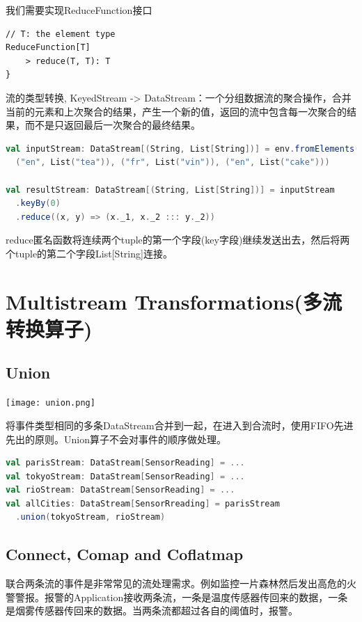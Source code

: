 \documentclass[oneside]{ctexbook}
\begin{document}
我们需要实现\colorbox{gray!20}{ReduceFunction}接口

\begin{lstlisting}
// T: the element type
ReduceFunction[T]
    > reduce(T, T): T
}
\end{lstlisting}

流的类型转换, KeyedStream -> DataStream：一个分组数据流的聚合操作，合并当前的元素和上次聚合的结果，产生一个新的值，返回的流中包含每一次聚合的结果，而不是只返回最后一次聚合的最终结果。

\begin{lstlisting}[language=scala, breaklines]
val inputStream: DataStream[(String, List[String])] = env.fromElements(
  ("en", List("tea")), ("fr", List("vin")), ("en", List("cake")))

val resultStream: DataStream[(String, List[String])] = inputStream
  .keyBy(0)
  .reduce((x, y) => (x._1, x._2 ::: y._2))
\end{lstlisting}

reduce匿名函数将连续两个tuple的第一个字段(key字段)继续发送出去，然后将两个tuple的第二个字段List[String]连接。

\section{Multistream Transformations(多流转换算子)}

\subsection{Union}

\noindent \texttt{[image: union.png]}

将事件类型相同的多条DataStream合并到一起，在进入到合流时，使用FIFO先进先出的原则。Union算子不会对事件的顺序做处理。

\begin{lstlisting}[language=scala, breaklines]
val parisStream: DataStream[SensorReading] = ...
val tokyoStream: DataStream[SensorReading] = ...
val rioStream: DataStream[SensorReading] = ...
val allCities: DataStream[SensorRreading] = parisStream
  .union(tokyoStream, rioStream)
\end{lstlisting}

\subsection{Connect, Comap and Coflatmap}

联合两条流的事件是非常常见的流处理需求。例如监控一片森林然后发出高危的火警警报。报警的Application接收两条流，一条是温度传感器传回来的数据，一条是烟雾传感器传回来的数据。当两条流都超过各自的阈值时，报警。
\end{document}
